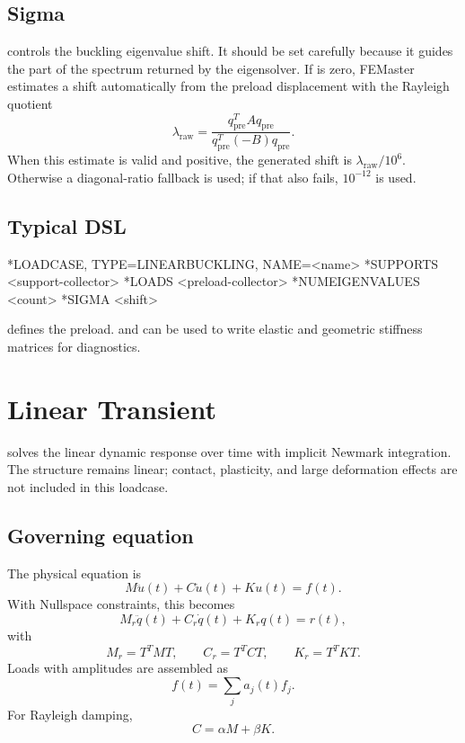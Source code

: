 \subsection{Sigma}

 controls the buckling eigenvalue shift. It should be set carefully because it guides the part of the spectrum returned by the eigensolver. If  is zero, FEMaster estimates a shift automatically from the preload displacement with the Rayleigh quotient
\[
\lambda_\mathrm{raw}
=
\frac{q_\mathrm{pre}^T A q_\mathrm{pre}}
       {q_\mathrm{pre}^T(-B)q_\mathrm{pre}} .
\]
When this estimate is valid and positive, the generated shift is \(\lambda_\mathrm{raw}/10^6\). Otherwise a diagonal-ratio fallback is used; if that also fails, \(10^{-12}\) is used.

\subsection{Typical DSL}

\begin{syntax}
*LOADCASE, TYPE=LINEARBUCKLING, NAME=<name>
  *SUPPORTS
  <support-collector>
  *LOADS
  <preload-collector>
  *NUMEIGENVALUES
  <count>
  *SIGMA
  <shift>
\end{syntax}

 defines the preload.  and  can be used to write elastic and geometric stiffness matrices for diagnostics.

\section{Linear Transient}
\label{sec:loadcase-linear-transient}

 solves the linear dynamic response over time with implicit Newmark integration. The structure remains linear; contact, plasticity, and large deformation effects are not included in this loadcase.

\subsection{Governing equation}

The physical equation is
\[
M\ddot u(t)+C\dot u(t)+Ku(t)=f(t).
\]
With Nullspace constraints, this becomes
\[
M_r\ddot q(t)+C_r\dot q(t)+K_rq(t)=r(t),
\]
with
\[
M_r=T^TMT,\qquad C_r=T^TCT,\qquad K_r=T^TKT .
\]
Loads with amplitudes are assembled as
\[
f(t)=\sum_j a_j(t)f_j .
\]
For Rayleigh damping,
\[
C=\alpha M+\beta K .
\]

